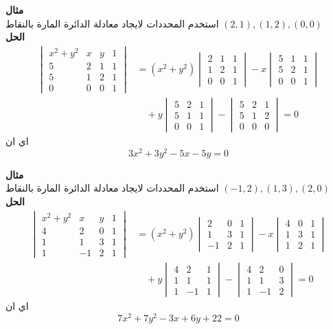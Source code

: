 \noindent
\textbf{مثال}\\
\noindent
استخدم المحددات لايجاد معادلة الدائرة المارة بالنقاط
$(2, 1), (1,2), (0,0)$\\
\noindent
\textbf{الحل}
\begin{align*}
	\begin{vmatrix}
		x^2+y^2 & x & y & 1\\
		5 & 2 & 1 & 1\\
		5 & 1 & 2 & 1 \\
		0 & 0 & 0 & 1
	\end{vmatrix} & = (x^2 +y^2)
	\begin{vmatrix}
		2&1&1\\
		1&2&1\\
		0&0&1
	\end{vmatrix}
	-x
	\begin{vmatrix}
		5&1&1\\
		5&2&1\\
		0&0&1
	\end{vmatrix}\\
	& \quad +y
	\begin{vmatrix}
		5&2&1\\
		5&1&1\\
		0&0&1
	\end{vmatrix}
	-
	\begin{vmatrix}
		5&2&1\\
		5&1&2\\
		0&0&0
	\end{vmatrix} =0
\end{align*}
اي ان 
\[
3x^2 + 3y^2 -5x -5y = 0
\]

\noindent
\textbf{مثال}\\
\noindent
استخدم المحددات لايجاد معادلة الدائرة المارة بالنقاط
$(-1, 2), (1,3), (2,0)$\\
\noindent
\textbf{الحل}
\begin{align*}
	\begin{vmatrix}
		x^2+y^2 & x & y & 1\\
		4 & 2 & 0 & 1\\
		1 & 1 & 3 & 1 \\
		1 & -1 & 2 & 1
	\end{vmatrix} & = (x^2 +y^2)
	\begin{vmatrix}
		2&0&1\\
		1&3&1\\
		-1&2&1
	\end{vmatrix}
	-x
	\begin{vmatrix}
		4&0&1\\
		1&3&1\\
		1&2&1
	\end{vmatrix}\\
	& \quad +y
	\begin{vmatrix}
		4&2&1\\
		1&1&1\\
		1&-1&1
	\end{vmatrix}
	-
	\begin{vmatrix}
		4&2&0\\
		1&1&3\\
		1&-1&2
	\end{vmatrix} =0
\end{align*}
اي ان 
\[
7x^2+7y^2 -3x + 6y + 22 =0
\]
